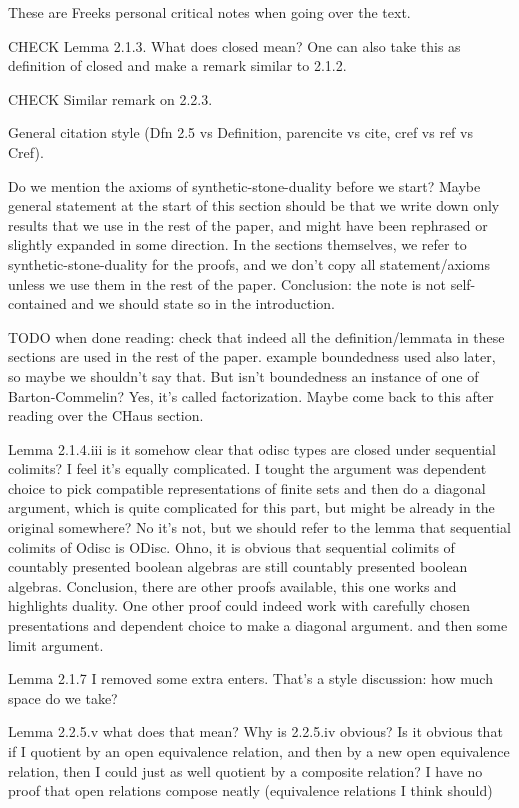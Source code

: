 These are Freeks personal critical notes when going over the text. 

CHECK Lemma 2.1.3. What does closed mean? One can also take this as definition of closed and make a remark similar to 2.1.2. 

CHECK Similar remark on 2.2.3. 

General citation style (Dfn 2.5 vs Definition, parencite vs cite, cref vs ref vs Cref). 

Do we mention the axioms of synthetic-stone-duality before we start?
Maybe general statement at the start of this section should be that we write down only results that we use in the rest of the paper, and might have been rephrased or slightly expanded in some direction. In the sections themselves, we refer to synthetic-stone-duality for the proofs, and we don't copy all statement/axioms unless we use them in the rest of the paper. 
Conclusion: the note is not self-contained and we should state so in the introduction. 


TODO when done reading: check that indeed all the definition/lemmata in these sections are used in the rest of the paper. 
example boundedness used also later, so maybe we shouldn't say that. But isn't boundedness an instance of one of Barton-Commelin? Yes, it's called factorization. Maybe come back to this after reading over the CHaus section. 

Lemma 2.1.4.iii is it somehow clear that odisc types are closed under sequential colimits? I feel it's equally complicated. I tought the argument was dependent choice to pick compatible representations of finite sets and then do a diagonal argument, which is quite complicated for this part, but might be already in the original somewhere? No it's not, but we should refer to the lemma that sequential colimits of Odisc is ODisc. Ohno, it is obvious that sequential colimits of countably presented boolean algebras are still countably presented boolean algebras. 
Conclusion, there are other proofs available, this one works and highlights duality. One other proof could indeed work with carefully chosen presentations and dependent choice to make a diagonal argument. and then some limit argument. 

Lemma 2.1.7 I removed some extra enters. That's a style discussion: how much space do we take?

Lemma 2.2.5.v what does that mean? 
Why is 2.2.5.iv obvious? Is it obvious that if I quotient by an open equivalence relation, and then by a new open equivalence relation, then I could just as well quotient by a composite relation? I have no proof that open relations compose neatly (equivalence relations I think should)

